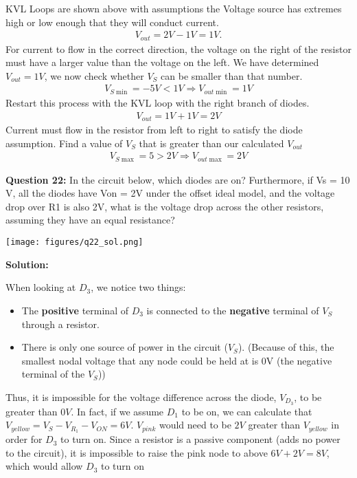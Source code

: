 \documentclass{article}
\begin{document}
KVL Loops are shown above with assumptions the Voltage source has extremes high or low enough that they will conduct current.
\begin{align*}
    V_{out} = 2V-1V = 1V.
\end{align*}
\indent For current to flow in the correct direction, the voltage on the right of the resistor must have a larger value than the voltage on the left. We have determined $V_{out} = 1V$, we now check whether $V_S$ can be smaller than that number.
\begin{align*}
    V_{S\min} = -5V < 1V \Rightarrow \boxed{V_{out\min} = 1V}
\end{align*}
\indent Restart this process with the KVL loop with the right branch of diodes. 
\begin{align*}
    V_{out} = 1V+1V = 2V
\end{align*}
\indent Current must flow in the resistor from left to right to satisfy the diode assumption. Find a value of $V_S$ that is greater than our calculated $V_{out}$
\begin{align*}
    V_{S\max} = 5 > 2V \Rightarrow \boxed{V_{out\max} = 2V}
\end{align*}


\textbf{Question 22:} In the circuit below, which diodes are on? Furthermore, if Vs = 10 V, all the diodes have Von = 2V under the offset ideal model, and the voltage drop over R1 is also 2V, what is the voltage drop across the other resistors, assuming they have an equal resistance?

\begin{center}
    \texttt{[image: figures/q22\_sol.png]}
\end{center}

\textbf{Solution:} 

When looking at $D_3$, we notice two things:
\begin{itemize}
    \item The \textbf{positive} terminal of $D_3$ is connected to the \textbf{negative} terminal of $V_S$ through a resistor.
    \item There is only one source of power in the circuit ($V_S$). (Because of this, the smallest nodal voltage that any node could be held at is 0V (the negative terminal of the $V_S$))
\end{itemize}

Thus, it is impossible for the voltage difference across the diode, $V_{D_3}$, to be greater than $0V$. In fact, if we assume $D_1$ to be on, we can calculate that $V_{yellow} = V_S - V_{R_1} - V_{ON} = 6V$. $V_{pink}$ would need to be $2V$ greater than $V_{yellow}$ in order for $D_3$ to turn on. Since a resistor is a passive component (adds no power to the circuit), it is impossible to raise the pink node to above $6V+2V = 8V$, which would allow $D_3$ to turn on 
\end{document}
